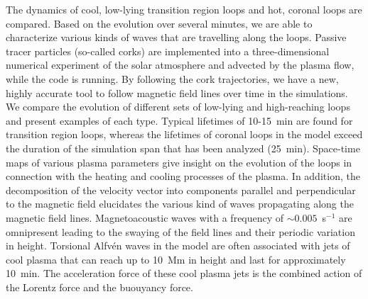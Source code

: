 \documentclass{aa}
\begin{document}
{%
%
}{%
%
The dynamics of cool, low-lying transition region loops and hot, coronal loops are compared. 
Based on the evolution over several minutes, we are able to characterize various kinds of waves that are travelling along the loops. 
}{%
%
Passive tracer particles (so-called corks) are implemented into a three-dimensional numerical experiment of the solar atmosphere and advected by the plasma flow, while the code is running. By following the cork trajectories, we have a new, highly accurate tool to follow magnetic field lines over time in the simulations. %
}{%
%
We compare the evolution of different sets of low-lying and high-reaching loops and present examples of each type. Typical lifetimes of 10-15~min are found for transition region loops, whereas the lifetimes of coronal loops in the model exceed the duration of the simulation span that has been analyzed (25~min). Space-time maps of various plasma parameters give insight on the evolution of the loops in connection with the heating and cooling processes of the plasma. In addition, the decomposition of the velocity vector into components parallel and perpendicular to the magnetic field elucidates the various kind of waves propagating along the magnetic field lines. Magnetoacoustic waves with a frequency of $\sim 0.005 $~s$^{-1}$ are omnipresent {\color{blue}leading to} the swaying of the field lines and their periodic variation in height. Torsional Alfv\'en waves in the model are often associated with jets of cool plasma that can reach up to 10~Mm in height and last for approximately 10~min. The acceleration force of these cool plasma jets is the combined action of the Lorentz force and the buouyancy force. 
}
\end{document}
